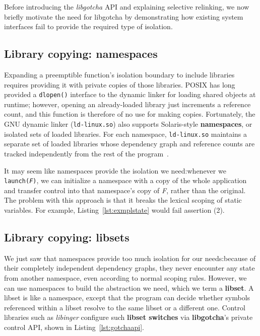 Before introducing the \textit{libgotcha} API and explaining selective relinking, we
now briefly motivate the need for libgotcha by demonstrating how existing system
interfaces fail to provide the required type of isolation.


\subsection{Library copying: namespaces}

Expanding a preemptible function's isolation boundary to include libraries requires
providing it with private copies of those libraries.  POSIX has long provided a
\texttt{dlopen()} interface to the dynamic linker for loading shared objects at
runtime; however, opening an already-loaded library just increments
a reference count, and this function is therefore of no use for making copies.
Fortunately, the GNU dynamic linker (\texttt{ld-linux.so}) also supports
Solaris-style \textbf{namespaces}, or isolated sets of loaded libraries.  For each
namespace, \texttt{ld-linux.so} maintains a separate set of loaded libraries whose
dependency graph and reference counts are tracked independently from the rest of the
program~\cite{dlmopen-manpage}.

It may seem like namespaces provide the isolation we need:\@ whenever we
\texttt{launch(\textnormal{\textit{F}})}, we can initialize a namespace with a copy
of the whole application and transfer control into that namespace's copy of
\textit{F}, rather than the original.  The problem with this approach is that it
breaks the lexical scoping of static variables.  For example,
Listing~\ref{lst:exmplstate} would fail assertion (2).



\subsection{Library copying: libsets}

We just saw that namespaces provide too much isolation
for our needs:\@ because of their completely independent dependency graphs, they
never encounter any state from another namespace, even according to normal scoping
rules.  However, we can use namespaces to build the abstraction we need, which we
term a \textbf{libset}.  A libset is like a namespace, except that the program can
decide whether symbols referenced within a libset resolve to the same
libset or a different one.  Control libraries such as \textit{libinger} configure such
\textbf{libset switches} via \textbf{libgotcha}'s private control API, shown
in Listing~\ref{lst:gotchaapi}.

